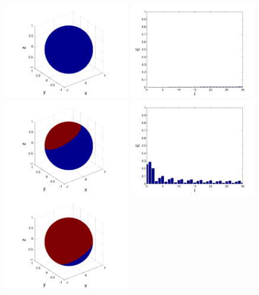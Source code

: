 \begin{refsection}
\begin{figure}
\centering
\includegraphics[width=0.49\textwidth]{kugel/Dkonstant/Kugel1_1.pdf}
\includegraphics[width=0.49\textwidth]{kugel/Dkonstant/Kugel1_2.pdf}
\includegraphics[width=0.49\textwidth]{kugel/Dkonstant/Kugel2_1.pdf}
\includegraphics[width=0.49\textwidth]{kugel/Dkonstant/Kugel2_2.pdf}
\includegraphics[width=0.49\textwidth]{kugel/Dkonstant/Kugel3_1.pdf}

\end{figure}
\end{refsection}
